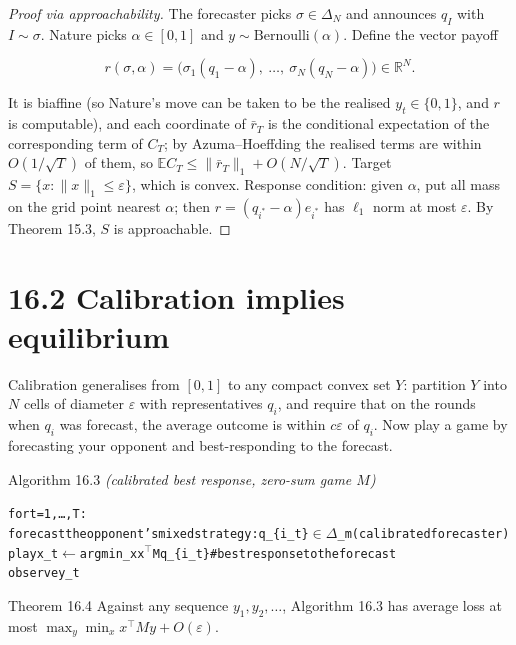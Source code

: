 \documentclass[11pt,a4paper,openany]{book}
\newcommand{\R}{\mathbb{R}}
\newcommand{\E}{\mathbb{E}}
\newcommand{\eps}{\varepsilon}
\newcommand{\norm}[1]{\lVert #1\rVert}
\newcommand{\simplex}{\Delta}
\newenvironment{algo}{\par\smallskip\begingroup\footnotesize\begin{alltt}}{\end{alltt}\endgroup\smallskip}
\begin{document}
\begin{proof}[Proof via approachability]
The forecaster picks $\sigma\in\simplex_N$ and announces $q_I$ with $I\sim\sigma$. Nature picks $\alpha\in[0,1]$ and $y\sim\mathrm{Bernoulli}(\alpha)$. Define the vector payoff

\[r(\sigma,\alpha)=\big(\sigma_1(q_1-\alpha),\ \dots,\ \sigma_N(q_N-\alpha)\big)\in\R^N.\]

It is biaffine (so Nature's move can be taken to be the realised $y_t\in\{0,1\}$, and $r$ is computable), and each coordinate of $\bar r_T$ is the conditional expectation of the corresponding term of $C_T$; by Azuma–Hoeffding the realised terms are within $O(1/\sqrt T)$ of them, so $\E C_T\le\norm{\bar r_T}_1+O(N/\sqrt T)$. Target $S=\{x:\norm x_1\le\eps\}$, which is convex. Response condition: given $\alpha$, put all mass on the grid point nearest $\alpha$; then $r=(q_{i^*}-\alpha)e_{i^*}$ has $\ell_1$ norm at most $\eps$. By Theorem 15.3, $S$ is approachable.
\end{proof}

\section*{16.2 Calibration implies equilibrium}\label{ch16-games}

Calibration generalises from $[0,1]$ to any compact convex set $Y$: partition $Y$ into $N$ cells of diameter $\eps$ with representatives $q_i$, and require that on the rounds when $q_i$ was forecast, the average outcome is within $c\eps$ of $q_i$. Now play a game by forecasting your opponent and best-responding to the forecast.

\begin{balg}{Algorithm 16.3 \emph{(calibrated best response, zero-sum game $M$)}}
\begin{algo}
for t = 1, …, T:
    forecast the opponent's mixed strategy:  q\_\{i\_t\} \ensuremath{\in} \ensuremath{\Delta}\_m  (calibrated forecaster)
    play x\_t \ensuremath{\leftarrow} argmin\_x  x\ensuremath{^{\top}} M q\_\{i\_t\}            \# best response to the forecast
    observe y\_t
\end{algo}
\end{balg}

\begin{bthm}{Theorem 16.4}
Against any sequence $y_1,y_2,\dots$, Algorithm 16.3 has average loss at most $\max_y\min_xx^\top My+O(\eps)$.
\end{bthm}
\end{document}
